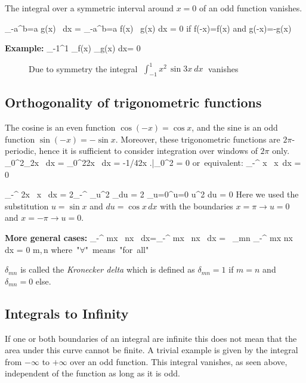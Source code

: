 The integral over a symmetric interval around $x=0$ of an odd function vanishes.
 
\bnn 
\int_{-a}^{b=a} g(x) \, dx = \int_{-a}^{b=a} f(x) \, g(x) \: dx = 0 \qquad
\mbox{if} \;\; f(-x)=f(x) \quad \mbox{and} \quad g(-x)=-g(x) 
\enn

{\bf Example:}
\bnn \int_{-1}^1 _{f(x)} _{g(x)}\: dx= 0 \enn

\begin{figure}[!h]
    \centerline{\epsfxsize=12cm \epsfysize=8cm  } \svs
    \caption{Due to symmetry the integral $\; \int_{-1}^1 x^2 \, \sin 3x\:dx\;$ vanishes} \label{fig26}
\end{figure} \vs \svs

\subsection{Orthogonality of trigonometric functions}
The cosine is an even function $\cos (-x)=\cos x$, and the sine is an odd function \mbox{$\sin(-x)=-\sin x$.}
Moreover, these trigonometric functions are $2\pi$-periodic, hence it is sufficient to consider integration
over windows of $2\pi$ only.
\bnn
\int_0^{2\pi}_{\sin 2x} \, dx
    =  \int_0^{2\pi}\sin 2x \, dx = -1/4\cos 2x \! \left.\frac{}{}\right|_0^{2\pi} = 0 \quad \mbox{or equivalent:} \;\;
     \int_{-\pi}^{\pi} \sin x \, \cos x\, dx = 0
\enn

\bnn
\int_{-\pi}^{\pi} \sin 2x \, \sin x \, dx = 2\int_{-\pi}^{\pi} _{u^2} \; _{du}
    = 2 \int_{u=0}^{u=0} u^2 \: du = 0
\enn
Here we used the substitution $u=\sin x$ and $du=\cos x \, dx$ with the boundaries $x=\pi \rightarrow u=0$
and $x=-\pi \rightarrow u=0$. \svs

{\bf More general cases:}
\bnn \int_{-\pi}^{\pi} \cos mx \, \cos nx \, dx=\int_{-\pi}^{\pi} \sin mx \, \sin nx \, dx = \pi \, \delta_{mn} \enn
\bnn \int_{-\pi}^{\pi} \cos mx \sin nx \, dx = 0 \;\; \forall \;\; m,\,n \qquad\mbox{where "$\forall$" means "for all"} \enn

$\delta_{mn}$ is called the {\em Kronecker delta} which is defined as $\delta_{mn}=1$ if $m=n$ and $\delta_{mn}=0$ else.

\subsection{Integrals to Infinity}
If one or both boundaries of an integral are infinite this does not mean that the area under this curve
cannot be finite. A trivial example is given by the integral from $-\infty$ to $+\infty$ over an odd function.
This integral vanishes, as seen above, independent of the function as long as it is odd.


